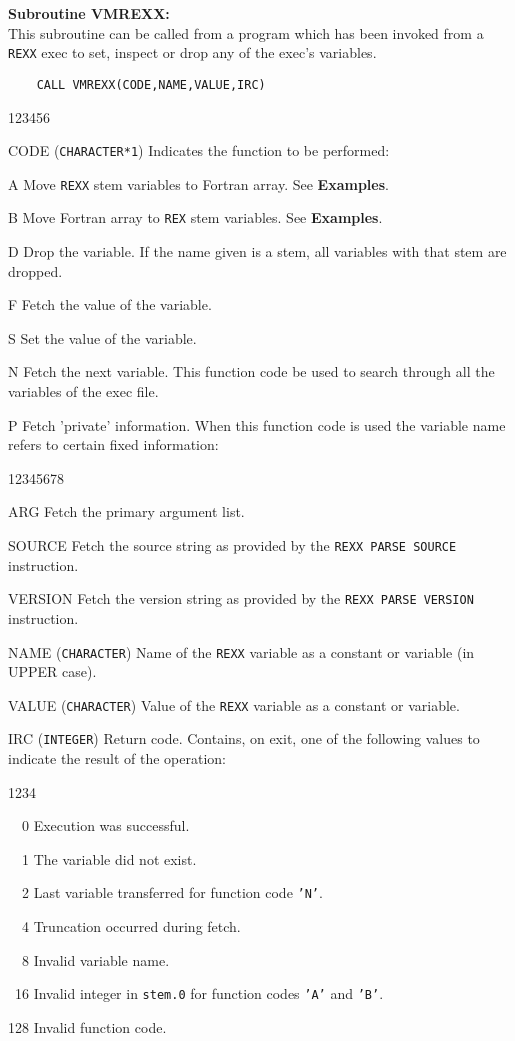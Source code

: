 \newpage
{\bf Subroutine VMREXX:} \\[2mm]
This subroutine can be called from a program which has been invoked
from a {\tt REXX} exec to set, inspect or drop any of the exec's
variables.
\begin{verbatim}
    CALL VMREXX(CODE,NAME,VALUE,IRC)
\end{verbatim}
\begin{DLtt}{123456}
\item[CODE] ({\tt CHARACTER*1}) Indicates the function to be performed:
\begin{DLtt}{12}
\item[A] Move {\tt REXX} stem variables to Fortran array.
See {\bf Examples}.
\item[B] Move Fortran array to {\tt REX} stem variables.
See {\bf Examples}.
\item[D] Drop the variable. If the name given is a stem, all
variables with that stem are dropped.
\item[F] Fetch the value of the variable.
\item[S] Set the value of the variable.
\item[N] Fetch the next variable. This function code be used
to search through all the variables of the exec file.
\item[P] Fetch 'private' information. When this function code is used
the variable name refers to certain fixed information:
\begin{DLtt}{12345678}
\item[ARG] Fetch the primary argument list.
\item[SOURCE] Fetch the source string as provided by the
{\tt REXX PARSE SOURCE} instruction.
\item[VERSION] Fetch the version string as provided by the
{\tt REXX PARSE VERSION} instruction.
\end{DLtt}
\end{DLtt}
\item[NAME] ({\tt CHARACTER}) Name of the {\tt REXX} variable as a
constant or variable (in UPPER case).
\item[VALUE] ({\tt CHARACTER}) Value of the {\tt REXX} variable as a
constant or variable.
\item[IRC] ({\tt INTEGER}) Return code. Contains, on exit,
one of the following values to indicate the result of the operation:
\begin{DLtt}{1234}
\item[\ \ 0] Execution was successful.
\item[\ \ 1] The variable did not exist.
\item[\ \ 2] Last variable transferred for function code {\tt 'N'}.
\item[\ \ 4] Truncation occurred during fetch.
\item[\ \ 8] Invalid variable name.
\item[\ 16] Invalid integer in {\tt stem.0} for function codes
{\tt 'A'} and {\tt 'B'}.
\item[128] Invalid function code.
\end{DLtt}
\end{DLtt}
